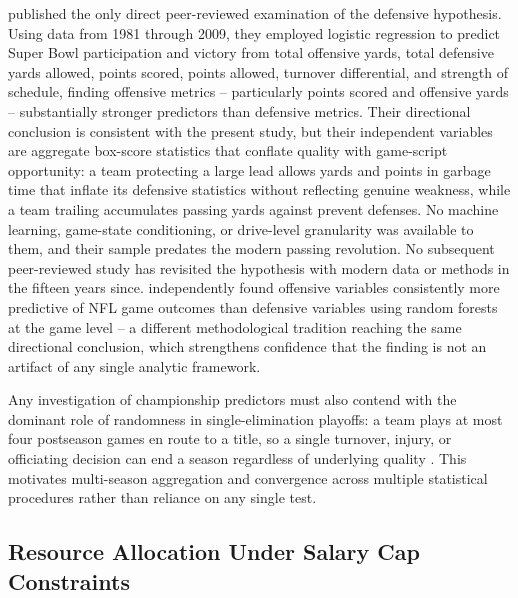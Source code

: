 \documentclass[12pt,a4paper]{article}
\begin{document}
\citet{robst2011defense} published the only direct peer-reviewed examination of the defensive hypothesis. Using data from 1981 through 2009, they employed logistic regression to predict Super Bowl participation and victory from total offensive yards, total defensive yards allowed, points scored, points allowed, turnover differential, and strength of schedule, finding offensive metrics -- particularly points scored and offensive yards -- substantially stronger predictors than defensive metrics. Their directional conclusion is consistent with the present study, but their independent variables are aggregate box-score statistics that conflate quality with game-script opportunity: a team protecting a large lead allows yards and points in garbage time that inflate its defensive statistics without reflecting genuine weakness, while a team trailing accumulates passing yards against prevent defenses. No machine learning, game-state conditioning, or drive-level granularity was available to them, and their sample predates the modern passing revolution. No subsequent peer-reviewed study has revisited the hypothesis with modern data or methods in the fifteen years since. \citet{lock2014randomforests} independently found offensive variables consistently more predictive of NFL game outcomes than defensive variables using random forests at the game level -- a different methodological tradition reaching the same directional conclusion, which strengthens confidence that the finding is not an artifact of any single analytic framework.

Any investigation of championship predictors must also contend with the dominant role of randomness in single-elimination playoffs: a team plays at most four postseason games en route to a title, so a single turnover, injury, or officiating decision can end a season regardless of underlying quality \citep{lopez2018randomness}. This motivates multi-season aggregation and convergence across multiple statistical procedures rather than reliance on any single test.

\subsection{Resource Allocation Under Salary Cap Constraints}
\label{sec:resource-allocation-lit}
\end{document}

